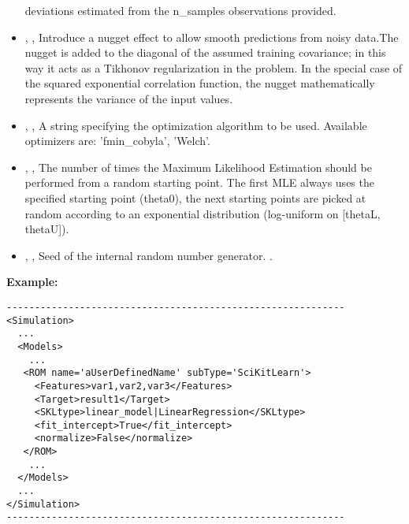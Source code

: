 \begin{itemize}
  deviations estimated from the n\_samples observations provided.
  \item {}, ,
  Introduce a nugget effect to allow smooth predictions from noisy data.The
  nugget is added to the diagonal of the assumed training covariance; in this
  way it acts as a Tikhonov regularization in the problem.
  In the special case of the squared exponential correlation function, the
  nugget mathematically represents the variance of the input values.
  \item {}, ,
  A string specifying the optimization algorithm to be used.
  Available optimizers are: 'fmin\_cobyla', 'Welch'.
  \item {}, ,
  The number of times the Maximum Likelihood Estimation should be performed from
  a random starting point.
  The first MLE always uses the specified starting point (theta0), the next
  starting points are picked at random according to an exponential distribution
  (log-uniform on [thetaL, thetaU]).
  \item {}, ,
  Seed of the internal random number generator.
  .
\end{itemize}

\textbf{Example:}
\begin{lstlisting}[style=XML]
------------------------------------------------------------
<Simulation>
  ...
  <Models>
    ...
   <ROM name='aUserDefinedName' subType='SciKitLearn'>
     <Features>var1,var2,var3</Features>
     <Target>result1</Target>
     <SKLtype>linear_model|LinearRegression</SKLtype>
     <fit_intercept>True</fit_intercept>
     <normalize>False</normalize>
   </ROM>
    ...
  </Models>
  ...
</Simulation>
------------------------------------------------------------
\end{lstlisting}

